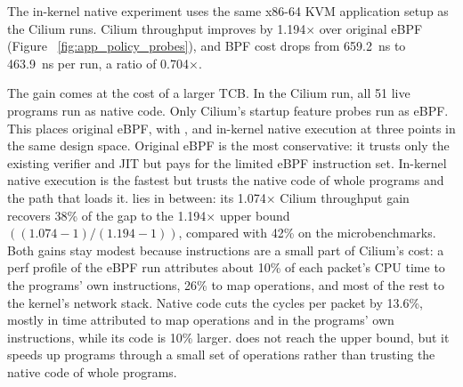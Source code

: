 The in-kernel native experiment uses the same x86-64 KVM application setup as the Cilium \lang runs.
Cilium throughput improves by 1.194$\times$ over original eBPF (Figure ~\ref{fig:app_policy_probes}), and BPF cost drops from 659.2~ns to 463.9~ns per run, a ratio of 0.704$\times$.

The gain comes at the cost of a larger TCB.
In the Cilium run, all 51 live programs run as native code. Only Cilium's startup feature probes run as eBPF.
This places original eBPF, \tool with \lang, and in-kernel native execution at three points in the same design space.
Original eBPF is the most conservative: it trusts only the existing verifier and JIT but pays for the limited eBPF instruction set.
In-kernel native execution is the fastest but trusts the native code of whole programs and the path that loads it.
\lang lies in between: its 1.074$\times$ Cilium throughput gain recovers 38\% of the gap to the 1.194$\times$ upper bound $((1.074{-}1)/(1.194{-}1))$, compared with 42\% on the microbenchmarks. Both gains stay modest because instructions are a small part of Cilium's cost: a perf profile of the eBPF run attributes about 10\% of each packet's CPU time to the programs' own instructions, 26\% to map operations, and most of the rest to the kernel's network stack. Native code cuts the cycles per packet by 13.6\%, mostly in time attributed to map operations and in the programs' own instructions, while its code is 10\% larger.
\lang does not reach the upper bound, but it speeds up programs through a small set of \lang operations rather than trusting the native code of whole programs.
